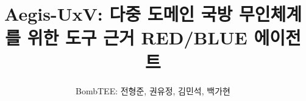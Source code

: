 \documentclass[runningheads]{llncs}
\begin{document}
%
\title{Aegis-UxV: 다중 도메인 국방 무인체계를 위한 도구 근거 RED/BLUE 에이전트}
%
%

\author{BombTEE: 전형준, 권유정, 김민석, 백가현}
%
%
%

\maketitle              %

\setcounter{secnumdepth}{3}
\setcounter{tocdepth}{3} 
\tableofcontents

\vspace{30pt}
\listoffigures 

\vspace{20pt}
\listoftables

\newpage











% 
%
%
%


%
\end{document}
